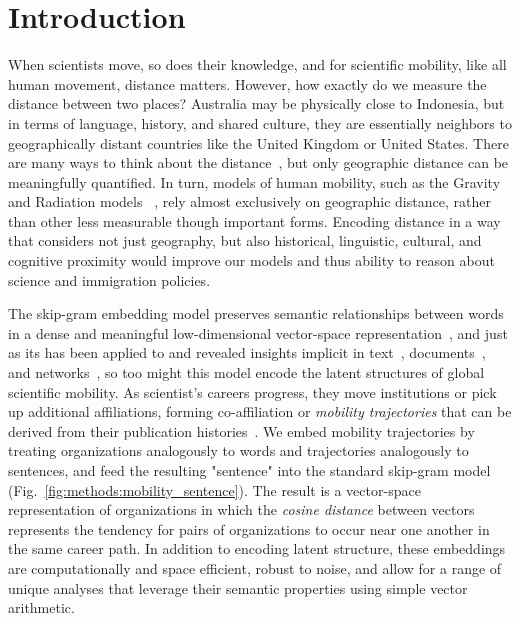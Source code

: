 \documentclass[12pt]{article} %
\begin{document}
%
%
\section{Introduction}\label{sec:introduction} %


When scientists move, so does their knowledge, and for scientific mobility, like all human movement, distance matters. 
However, how exactly do we measure the distance between two places?
Australia may be physically close to Indonesia, but in terms of language, history, and shared culture, they are essentially neighbors to geographically distant countries like the United Kingdom or United States. 
There are many ways to think about the distance~\autocite{boschma2005proximity}, but only geographic distance can be meaningfully quantified. 
In turn, models of human mobility, such as the Gravity~\autocite{zipf1946gravity} and Radiation models ~\autocite{simini2012universal}, rely almost exclusively on geographic distance, rather than other less measurable though important forms. 
Encoding distance in a way that considers not just geography, but also historical, linguistic, cultural, and cognitive proximity would improve our models and thus ability to reason about science and immigration policies. 

The skip-gram embedding model preserves semantic relationships between words in a dense and meaningful low-dimensional vector-space representation~\cite{mikolov2013word2vec}, and just as its has been applied to and revealed insights implicit in text~\cite{linzhuo2020hyperbolic, tshitoyan2019mat2vec, garg2018gender, kozlowski2018geometry}, documents~\autocite{le2014doc2vec, nakandala2016twitch}, and networks~\autocite{perozzi2014deepwalk, grover2016node2vec}, so too might this model encode the latent structures of global scientific mobility. 
As scientist's careers progress, they move institutions or pick up additional affiliations, forming co-affiliation or \textit{mobility trajectories} that can be derived from their publication histories~\autocite{robinson2019mobility, sugimoto2017mostimpact}. 
We embed mobility trajectories by treating organizations analogously to words and trajectories analogously to sentences, and feed the resulting "sentence" into the standard skip-gram model (Fig.~\ref{fig:methods:mobility_sentence}).
The result is a vector-space representation of organizations in which the \textit{cosine distance} between vectors represents the tendency for pairs of organizations to occur near one another in the same career path. 
In addition to encoding latent structure, these embeddings are computationally and space efficient, robust to noise, and allow for a range of unique analyses that leverage their semantic properties using simple vector arithmetic. 
\end{document}
